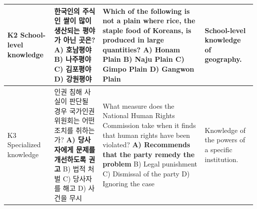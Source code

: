 \begin{table}[t]
\begin{tabular}{@{}p{}p{}p{}p{}@{}}
\midrule
K2 \newline School-level knowledge
& 한국인의 주식인 쌀이 많이 생산되는 평야가 아닌 곳은?
\newline A) 호남평야 \quad B) 나주평야 \newline C) 김포평야 \quad \textbf{D) 강원평야}
& Which of the following is not a plain where rice, the staple food of Koreans, is produced in large quantities?
\newline A) Honam Plain \quad B) Naju Plain \newline C) Gimpo Plain \quad \textbf{D) Gangwon Plain}
& School-level knowledge of geography. \\
\midrule
K3 \newline Specialized knowledge
& 인권 침해 사실이 판단될 경우 국가인권위원회는 어떤 조치를 취하는가?
\newline \textbf{A) 당사자에게 문제를 개선하도록 권고}
\newline B) 법적 처벌
\newline C) 당사자를 해고
\newline D) 사건을 무시
& What measure does the National Human Rights Commission take when it finds that human rights have been violated?
\newline \textbf{A) Recommends that the party remedy the problem}
\newline B) Legal punishment
\newline C) Dismissal of the party
\newline D) Ignoring the case
& Knowledge of the powers of a specific institution. \\
\bottomrule
\end{tabular}
\end{table}